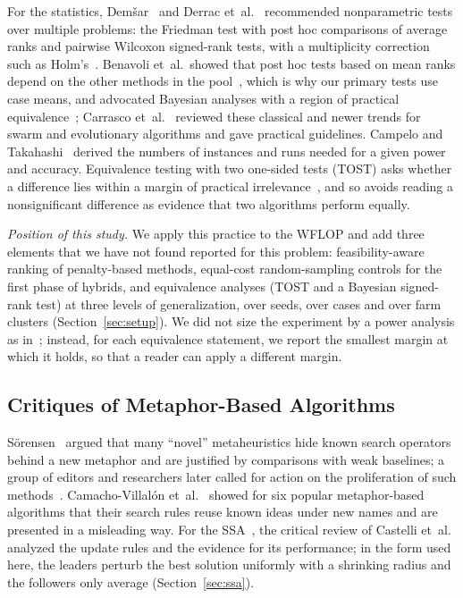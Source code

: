 For the statistics, Dem\v{s}ar~\cite{Demsar2006} and Derrac et~al.~\cite{Derrac2011} recommended nonparametric tests over multiple problems: the Friedman test with post hoc comparisons of average ranks and pairwise Wilcoxon signed-rank tests, with a multiplicity correction such as Holm's~\cite{Holm1979}. Benavoli et~al.\ showed that post hoc tests based on mean ranks depend on the other methods in the pool~\cite{Benavoli2016}, which is why our primary tests use case means, and advocated Bayesian analyses with a region of practical equivalence~\cite{Benavoli2017}; Carrasco et~al.~\cite{Carrasco2020} reviewed these classical and newer trends for swarm and evolutionary algorithms and gave practical guidelines. Campelo and Takahashi~\cite{Campelo2019} derived the numbers of instances and runs needed for a given power and accuracy. Equivalence testing with two one-sided tests (TOST) asks whether a difference lies within a margin of practical irrelevance~\cite{Lakens2017}, and so avoids reading a nonsignificant difference as evidence that two algorithms perform equally.

\emph{Position of this study.} We apply this practice to the WFLOP and add three elements that we have not found reported for this problem: feasibility-aware ranking of penalty-based methods, equal-cost random-sampling controls for the first phase of hybrids, and equivalence analyses (TOST and a Bayesian signed-rank test) at three levels of generalization, over seeds, over cases and over farm clusters (Section~\ref{sec:setup}). We did not size the experiment by a power analysis as in~\cite{Campelo2019}; instead, for each equivalence statement, we report the smallest margin at which it holds, so that a reader can apply a different margin.

\subsection{Critiques of Metaphor-Based Algorithms}
\label{sec:related-metaphor}
S\"orensen~\cite{Sorensen2015} argued that many ``novel'' metaheuristics hide known search operators behind a new metaphor and are justified by comparisons with weak baselines; a group of editors and researchers later called for action on the proliferation of such methods~\cite{Aranha2022}. Camacho-Villal\'on et~al.~\cite{CamachoVillalon2023} showed for six popular metaphor-based algorithms that their search rules reuse known ideas under new names and are presented in a misleading way. For the SSA~\cite{Mirjalili2017}, the critical review of Castelli et~al.~\cite{Castelli2022} analyzed the update rules and the evidence for its performance; in the form used here, the leaders perturb the best solution uniformly with a shrinking radius and the followers only average (Section~\ref{sec:ssa}).

